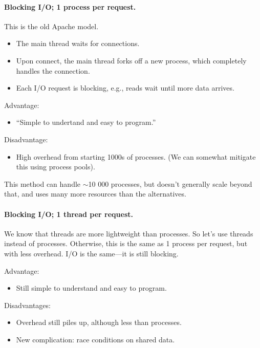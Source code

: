 \documentclass[a4paper]{report}
\begin{document}
\paragraph{Blocking I/O; 1 process per request.}
This is the old Apache model.
  \begin{itemize}
    \item The main thread waits for connections.
    \item Upon connect, the main thread forks off a new process, which completely
      handles the connection.
    \item Each I/O request is blocking, e.g., reads wait until more data arrives.
  \end{itemize}

Advantage: 
  \begin{itemize}
    \item ``Simple to undertand and easy to program.''
  \end{itemize}

Disadvantage:
  \begin{itemize}
    \item High overhead from starting 1000s of processes.
      (We can somewhat mitigate this using process pools).
  \end{itemize}
This method can handle $\sim$10 000 processes, but doesn't generally scale beyond that, and
uses many more resources than the alternatives.

\paragraph{Blocking I/O; 1 thread per request.}
    We know that threads are more lightweight than processes. So let's use threads instead
of processes. Otherwise, this is the same as 1 process per request, but with less overhead.
I/O is the same---it is still blocking.

    Advantage:
    \begin{itemize}
      \item Still simple to understand and easy to program.
    \end{itemize}

    Disadvantages:
    \begin{itemize}
      \item Overhead still piles up, although less than processes.
      \item New complication: race conditions on shared data.
    \end{itemize}
\end{document}
